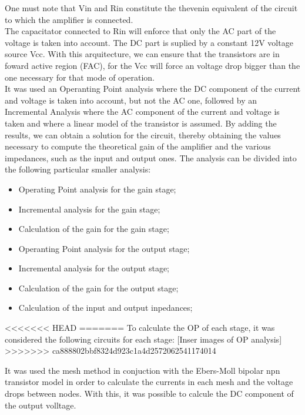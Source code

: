 One must note that Vin and Rin constitute the thevenin equivalent of the circuit to which the amplifier is connected.\\
The capacitator connected to Rin will enforce that only the AC part of the voltage is taken into account. The DC part is suplied by a constant 12V voltage source Vcc. With this arquitecture, we can ensure that the transistors are in foward active region (FAC), for the Vcc will force an voltage drop bigger than the one necessary for that mode of operation.\\
It was used an Operanting Point analysis where the DC component of the current and voltage is taken into account, but not the AC one, followed by an Incremental Analysis where the AC component of the current and voltage is taken and where a linear model of the transistor is assumed. By adding the results, we can obtain a solution for the circuit, thereby obtaining the values necessary to compute the theoretical gain of the amplifier and the various impedances, such as the input and output ones.
The analysis can be divided into the following particular smaller analysis:
\begin{itemize}
	\item Operating Point analysis for the gain stage;
	\item Incremental analysis for the gain stage;
	\item Calculation of the gain for the gain stage;
	\item Operanting Point analysis for the output stage;
	\item Incremental analysis for the output stage;
	\item Calculation of the gain for the output stage;
	\item Calculation of the input and output inpedances;
\end{itemize}

<<<<<<< HEAD
=======
To calculate the OP of each stage, it was considered the following circuits for each stage:
[Inser images of OP analysis]\\
>>>>>>> ca888802bbf8324d923c1a4d2572062541174014

It was used the mesh method in conjuction with the Ebers-Moll bipolar npn transistor model in order to calculate the currents in each mesh and the voltage drops between nodes. With this, it was possible to calcule the DC component of the output volltage.\

